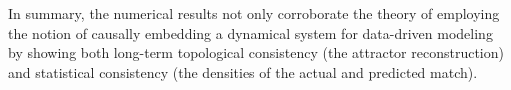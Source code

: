 
In summary, the numerical results not only corroborate the theory of employing the notion of causally embedding a dynamical system for data-driven modeling by showing both long-term topological consistency (the attractor reconstruction) and statistical consistency (the densities of the actual and predicted match).